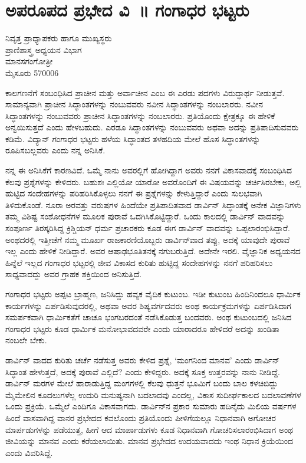 {\fontsize{14}{16}\selectfont
\chapter{ಅಪರೂಪದ ಪ್ರಭೇದ ವಿ~॥ ಗಂಗಾಧರ ಭಟ್ಟರು}

\begin{center}
\smallskip

ನಿವೃತ್ತ ಪ್ರಾಧ್ಯಾಪಕರು ಹಾಗೂ ಮುಖ್ಯಸ್ಥರು\\
ಪ್ರಾಣಿಶಾಸ್ತ್ರ ಅಧ್ಯಯನ ವಿಭಾಗ\\ 
ಮಾನಸಗಂಗೋತ್ರೀ\\ 
ಮೈಸೂರು   \enginline{-}   570006
\addrule
\end{center}

ಕಾಲಗಣನೆಗೆ ಸಂಬಂಧಿಸಿದ ಪ್ರಾಚೀನ ಮತ್ತು ಅರ್ವಾಚೀನ ಎಂಬ ಈ ಎರಡು ಪದಗಳು ವಿರುದ್ಧಾರ್ಥ ನೀಡುತ್ತವೆ.  ಸಾಮಾನ್ಯವಾಗಿ ಪ್ರಾಚೀನ ಸಿದ್ಧಾಂತಗಳನ್ನು ನಂಬು\-ವವರು ನವೀನ ಸಿದ್ಧಾಂತಗಳನ್ನು ನಂಬಲಾರರು.  ನವೀನ ಸಿದ್ಧಾಂತಗಳನ್ನು ನಂಬು\-ವವರು ಪ್ರಾಚೀನ ಸಿದ್ಧಾಂತಗಳನ್ನು ನಂಬಲಾರರು.  ಪ್ರತಿಯೊಂದು ಕ್ಷೇತ್ರಕ್ಕೂ ಈ ಹೇಳಿಕೆ ಅನ್ವಯಿ\-ಸುತ್ತದೆ ಎಂದು ಹೇಳಬಹುದು.  ಎರಡೂ ಸಿದ್ಧಾಂತಗಳನ್ನು ನಂಬುವವರು ಅಥವಾ ಅದನ್ನು ಪ್ರತಿಪಾದಿಸುವವರು ಕಡಿಮೆ.  ವಿದ್ಯಾನ್ ಗಂಗಾಧರ ಭಟ್ಟರು ಹಳೆಯ ಸಿದ್ಧಾಂತದ ತಳಹದಿಯ ಮೇಲೆ ಹೊಸ ಸಿದ್ಧಾಂತಗಳನ್ನು ರೂಪಿಸಬಲ್ಲವರು ಎಂದು ನನ್ನ ಅನಿಸಿಕೆ.  

ನನ್ನ ಈ ಅನಿಸಿಕೆಗೆ ಕಾರಣವಿದೆ.  ಒಮ್ಮೆ ನಾನು ಅವರಲ್ಲಿಗೆ ಹೋಗಿದ್ದಾಗ ಅವರು ನನಗೆ ವಿಕಾಸವಾದಕ್ಕೆ ಸಂಬಂಧಿಸಿದ ಕೆಲವು ಪ್ರಶ್ನೆಗಳನ್ನು ಕೇಳಿದರು.  ಬಹುಶಃ ಎಲ್ಲಿಯೋ ಯಾರೋ ಅವರೊಂದಿಗೆ ಈ ವಿಷಯವನ್ನು ಚರ್ಚಿಸಿರಬೇಕು, ಅಲ್ಲಿ ಹುಟ್ಟಿದ ಸಂದೇಹಗಳನ್ನು ಪರಿಹರಿಸಿಕೊಳ್ಳಲು ನನಗೆ ಈ ಪ್ರಶ್ನೆಗಳನ್ನು ಕೇಳುತ್ತಿದ್ದಾರೆ ಎಂದು ಸುಲಭವಾಗಿ ತಿಳಿದುಕೊಂಡೆ.  ನೂರಾ ಅರವತ್ತು ವರುಷಗಳ ಹಿಂದೆಯೇ ಪ್ರತಿಪಾದಿತವಾದ ಡಾರ್ವಿನ್ ಸಿದ್ಧಾಂತಕ್ಕೆ ಅನೇಕ ವಿಜ್ಞಾನಿಗಳು ತಮ್ಮ ವಿಶಿಷ್ಟ ಸಂಶೋಧನೆಗಳ ಮೂಲಕ ಪುರಾವೆ ಒದಗಿಸಿ\-ಕೊಟ್ಟಿದ್ದಾರೆ.  ಒಂದು ಕಾಲದಲ್ಲಿ ಡಾರ್ವಿನ್ ವಾದವನ್ನು ಸಂಪೂರ್ಣ ತಿರಸ್ಕರಿಸಿದ್ದ ಕ್ರಿಶ್ಚಿಯನ್ ಧರ್ಮ ಪ್ರಚಾರಕರು ಕೂಡ ಈಗ ಡಾರ್ವಿನ್ ವಾದವನ್ನು ಒಪ್ಪಲಾರಂಭಿಸಿದ್ದಾರೆ.  ಅಂಥದರಲ್ಲಿ ಇತ್ತೀಚೆಗೆ ನಮ್ಮ ಮೂರ್ಖ ರಾಜಕಾರಣಿಯೊಬ್ಬರು ಡಾರ್ವಿನ್‍ವಾದ ತಪ್ಪು, ಅದಕ್ಕೆ ಯಾವುದೇ ಪುರಾವೆ ಇಲ್ಲ ಎಂದು ಹೇಳಿಕೆ ನೀಡಿದ್ದಾರೆ.  ಅವರ ಆಷಾಢಭೂತಿತನಕ್ಕೆ ನಗುಬರುತ್ತಿದೆ.  ಅದೇನೇ ಇರಲಿ.  ವೈಜ್ಞಾನಿಕ ಅಧ್ಯಯನದ ಹಿನ್ನೆಲೆ ಇಲ್ಲದ ಗಂಗಾಧರ ಭಟ್ಟರಲ್ಲಿ ಜೀವ ವಿಕಾಸದ ಕುರಿತು ಹುಟ್ಟಿದ್ದ ಸಂದೇಹಗಳನ್ನು ನನಗೆ ಪರಿಹರಿಸಲು ಸಾಧ್ಯವಾದದ್ದು ಅವರ ಗ್ರಾಹಕ ಶಕ್ತಿಯಿಂದ ಅನಿಸುತ್ತಿದೆ.  

ಗಂಗಾಧರ ಭಟ್ಟರು ಅಪ್ಪಟ ಬ್ರಾಹ್ಮಣ, ಜನಿಸಿದ್ದು ಹವ್ಯಕ ವೈದಿಕ ಕುಟುಂಬ.  ಇಡೀ ಕುಟುಂಬ ಹಿಂದಿನಿಂದಲೂ ಧಾರ್ಮಿಕ ಕಾರ್ಯಗಳನ್ನು ಏರ್ಪಡಿಸುವುದರಲ್ಲಿ, ಅಥವಾ ಅವರ ಶಿಷ್ಯವರ್ಗದವರು ಅಂಥ ಕಾರ್ಯಕ್ರಮಗಳನ್ನು ಏರ್ಪಡಿಸಿದಾಗ ಸಮರ್ಪಕ\-ವಾಗಿ ಧಾರ್ಮಿಕತೆಗೆ ಚಾಚೂ ಭಂಗಬರದಂತೆ ನಡೆಸಿಕೊಡುತ್ತ ಬಂದವರು.  ಅಂಥ ಕುಟುಂಬದಲ್ಲಿ ಜನಿಸಿದ ಗಂಗಾಧರ ಭಟ್ಟರು ಕೂಡ ಧಾರ್ಮಿಕ ಮನೋಭಾವದವರೇ ಎಂದು ಯಾರಾದರೂ ಹೇಳಿದರೆ ಅದನ್ನು ಖಂಡಿತಾ ನಂಬಲೇ ಬೇಕು.  

ಡಾರ್ವಿನ್ ವಾದದ ಕುರಿತು ಚರ್ಚೆ ನಡೆಸುತ್ತ ಅವರು ಕೇಳಿದ ಪ್ರಶ್ನೆ, ‘ಮಂಗನಿಂದ ಮಾನವ’ ಎಂದು ಡಾರ್ವಿನ್ ಸಿದ್ಧಾಂತ ಹೇಳುತ್ತದೆ, ಅದಕ್ಕೆ ಪುರಾವೆ ಎಲ್ಲಿದೆ?  ಎಂದು ಕೇಳಿದ್ದರು.  ಅದಕ್ಕೆ ಸೂಕ್ತ ಉತ್ತರವನ್ನು ನಾನು ನೀಡಿದ್ದೆ.  ಡಾರ್ವಿನ್ ಮರಗಳ ಮೇಲೆ ಹಾರಾಡುತ್ತಿದ್ದ ಮಂಗಗಳಲ್ಲಿ ಕೆಲವು ಧುತ್ತನೆ ಭೂಮಿಗೆ ಬಂದು ಬಾಲ ಕಳಚಿಬಿದ್ದು ಮೈಮೇಲಿನ ಕೂದಲುಗಳೆಲ್ಲ ಉದುರಿ ಮನುಷ್ಯನಾಗಿ ಬದಲಾದವು ಎಂದಲ್ಲ,  ವಿಕಾಸ ಸುದೀರ್ಘಕಾಲದ ಬದಲಾವಣೆಗಳ ಒಂದು ಪ್ರಕ್ರಿಯೆ.  ಒಮ್ಮೆಲೆ ಎಂದಿಗೂ ವಿಕಾಸ\-ವಾಗದು.  ಡಾರ್ವಿನ್‍ನ ಪ್ರಕಾರ ಸುಮಾರು ಹದಿನೈದು ಮಿಲಿಯ ವರ್ಷಗಳ ಹಿಂದೆ ವಾಸವಾಗಿದ್ದ ವಾನರ ಪ್ರಭೇದದ ಕವಲೊಂದು ಪ್ರತಿಯೊಂದು ಪೀಳಿಗೆಯಲ್ಲೂ ನಿಧಾನವಾಗಿ ಅಗೋಚರ  ಮಾರ್ಪಡುಗಳನ್ನು ಪಡೆಯುತ್ತ, ಹೀಗೆ ಆದ ಮಾರ್ಪಾಡುಗಳು ಕೂಡ ನಿಧಾನವಾಗಿ ಗೋಚರಿಸಲಾರಂಭಿಸಿದಾಗ ಅಂಥ ಜೀವಿಯನ್ನು ಮಾನವ ಎಂದು ಕರೆಯ\-ಲಾಯಿತು.  ಮಾನವ ಪ್ರಭೇದದ ಉದಯವಾದದು ಇಂಥ ನಿಧಾನ ಕ್ರಿಯೆಯಿಂದ ಎಂದು ವಿವರಿಸಿದ್ದೆ.  

}
